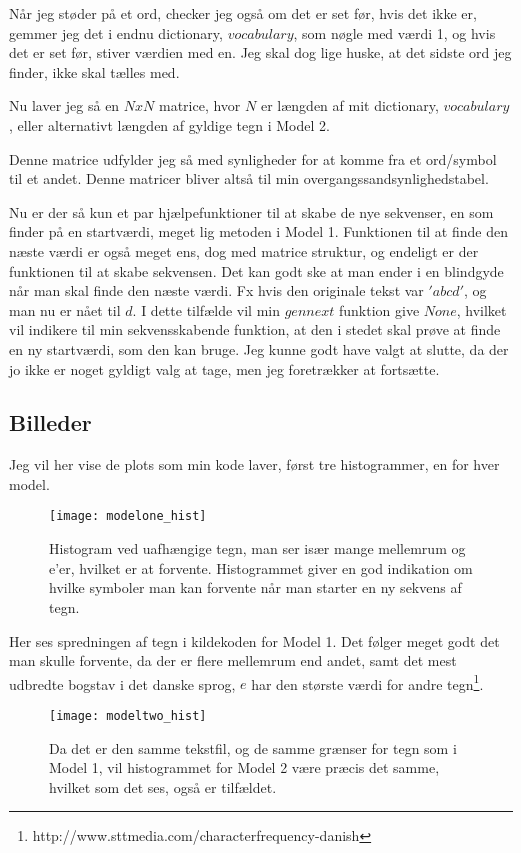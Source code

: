 \documentclass[11pt]{article} %
\begin{document}
Når jeg støder på et ord, checker jeg også om det er set før, hvis det ikke er, gemmer jeg det i endnu dictionary, $vocabulary$, som nøgle med værdi 1, og hvis det er set før, stiver værdien med en. Jeg skal dog lige huske, at det sidste ord jeg finder, ikke skal tælles med.

Nu laver jeg så en $NxN$ matrice, hvor $N$ er længden af mit dictionary, $vocabulary$, eller alternativt længden af gyldige tegn i Model 2.

Denne matrice udfylder jeg så med synligheder for at komme fra et ord/symbol til et andet. Denne matricer bliver altså til min overgangssandsynlighedstabel.

Nu er der så kun et par hjælpefunktioner til at skabe de nye sekvenser, en som finder på en startværdi, meget lig metoden i Model 1. Funktionen til at finde den næste værdi er også meget ens, dog med matrice struktur, og endeligt er der funktionen til at skabe sekvensen.
Det kan godt ske at man ender i en blindgyde når man skal finde den næste værdi. Fx hvis den originale tekst var $'abcd'$, og man nu er nået til $d$. I dette tilfælde vil min $gennext$ funktion give $None$, hvilket vil indikere til min sekvensskabende funktion, at den i stedet skal prøve at finde en ny startværdi, som den kan bruge. Jeg kunne godt have valgt at slutte, da der jo ikke er noget gyldigt valg at tage, men jeg foretrækker at fortsætte.
\subsection*{Billeder}
Jeg vil her vise de plots som min kode laver, først tre histogrammer, en for hver model.
\begin{figure}[h!]
\centering
  \texttt{[image: modelone\_hist]}
  \caption{Histogram ved uafhængige tegn, man ser især mange mellemrum og e'er, hvilket er at forvente. Histogrammet giver en god indikation om hvilke symboler man kan forvente når man starter en ny sekvens af tegn.}
  \label{fig:histone}
\end{figure}

Her ses spredningen af tegn i kildekoden for Model 1. Det følger meget godt det man skulle forvente, da der er flere mellemrum end andet, samt det mest udbredte bogstav i det danske sprog, $e$ har den største værdi for andre tegn\footnote{http://www.sttmedia.com/characterfrequency-danish}.

\begin{figure}[h!]
\centering
  \texttt{[image: modeltwo\_hist]}
  \caption{Da det er den samme tekstfil, og de samme grænser for tegn som i Model 1, vil histogrammet for Model 2 være præcis det samme, hvilket som det ses, også er tilfældet.}
  \label{fig:histtwo}
\end{figure}
\end{document}
